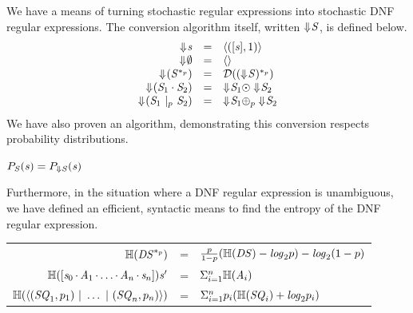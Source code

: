 \documentclass[acmsmall,screen,anonymous]{acmart}
\begin{document}
We have a means of turning stochastic regular expressions into stochastic DNF
regular expressions.
The conversion algorithm itself, written $\Downarrow\mkern-4mu \mathit{S}$, is defined below.
\[
  \begin{array}{rcl}
    \ToDNFRegexOf{\String} & = & \DNFOf{(\SequenceOf{\String},1)}\\
    \ToDNFRegexOf{\emptyset} & = & \DNFOf{}\\
    \ToDNFRegexOf{(\PRegexStar{\Regex}{\Probability})} & = & \AtomToDNFOf{\PRegexStar{(\ToDNFRegexOf{\Regex})}{\Probability}}\\
    \ToDNFRegexOf{(\RegexConcat{\Regex_1}{\Regex_2})} & = & \ToDNFRegexOf{\Regex_1} \ConcatDNF \ToDNFRegexOf{\Regex_2}\\
    \ToDNFRegexOf{(\PRegexOr{\Regex_1}{\Regex_2}{\Probability})} & = & \ToDNFRegexOf{\Regex_1} \OrDNF_{\Probability} \ToDNFRegexOf{\Regex_2}\\
  \end{array}
\]
We have also proven an algorithm, demonstrating this conversion respects
probability distributions.

\begin{theorem}
  $P_{\mathit{S}}(\mathit{s}) = P_{\Downarrow \mathit{S}}(\mathit{s})$
\end{theorem}

Furthermore, in the situation where a DNF regular expression is unambiguous, we
have defined an efficient, syntactic means to find the entropy of the DNF
regular expression.

\begin{center}
  \begin{tabular}{rcl}
    $\mathbb{H}(\mathit{DS}^{*_{p}})$
    & =
    & $\frac{p}{1-p}(\mathbb{H}(\mathit{DS}) - \mathit{log}_2p)
      - \mathit{log}_2(1-p)
      $\\
    
    $\mathbb{H}([\mathit{s}_0 \mkern-1mu\cdot\mkern-1mu \mathit{A}_1 \mkern-1mu\cdot\mkern-1mu \ldots \mkern-1mu\cdot\mkern-1mu \mathit{A}_n \mkern-1mu\cdot\mkern-1mu \mathit{s}_n]){\mathit{s}'}$
    & =
    & $\Sigma_{i = 1}^n\mathbb{H}(\mathit{A}_i)$ \\
    
    $\mathbb{H}(\langle(\mathit{SQ}_1,p_1) ~|~ \ldots ~|~ (\mathit{SQ}_n,p_n)\rangle)$
    & =
    & $\Sigma_{i=1}^np_i(\mathbb{H}(\mathit{SQ}_i)+\mathit{log}_2p_i)$\\
  \end{tabular}
\end{center}
\end{document}
